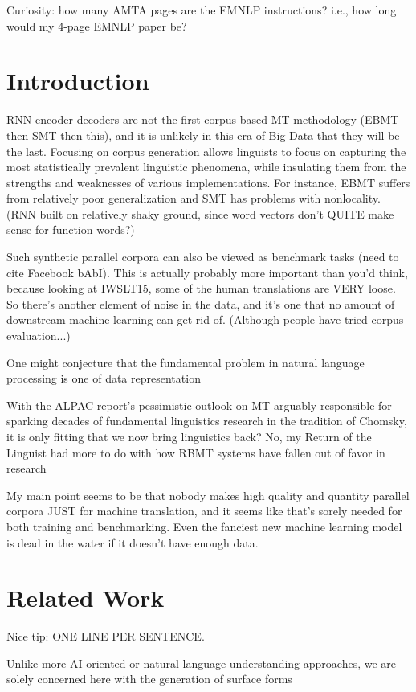 Curiosity: how many AMTA pages are the EMNLP instructions? i.e., how long would my 4-page EMNLP paper be?


\section{Introduction}

RNN encoder-decoders are not the first corpus-based MT methodology (EBMT then SMT then this), and it is unlikely in this era of Big Data that they will be the last.
Focusing on corpus generation allows linguists to focus on capturing the most statistically prevalent linguistic phenomena, while insulating them from the strengths and weaknesses of various implementations.
For instance, EBMT suffers from relatively poor generalization and SMT has problems with nonlocality.
(RNN built on relatively shaky ground, since word vectors don't QUITE make sense for function words?)
 
Such synthetic parallel corpora can also be viewed as benchmark tasks (need to cite Facebook bAbI).
This is actually probably more important than you'd think, because looking at IWSLT15, some of the human translations are VERY loose.
So there's another element of noise in the data, and it's one that no amount of downstream machine learning can get rid of.
(Although people have tried corpus evaluation...)

One might conjecture that the fundamental problem in natural language processing is one of data representation

With the ALPAC report's pessimistic outlook on MT arguably responsible for sparking decades of fundamental linguistics research in the tradition of Chomsky, it is only fitting that we now bring linguistics back?
No, my Return of the Linguist had more to do with how RBMT systems have fallen out of favor in research

My main point seems to be that nobody makes high quality and quantity parallel corpora JUST for machine translation, and it seems like that's sorely needed for both training and benchmarking.
Even the fanciest new machine learning model is dead in the water if it doesn't have enough data.

\section{Related Work}
\label{sec:related}

Nice tip: ONE LINE PER SENTENCE.

Unlike more AI-oriented or natural language understanding approaches, we are solely concerned here with the generation of surface forms

